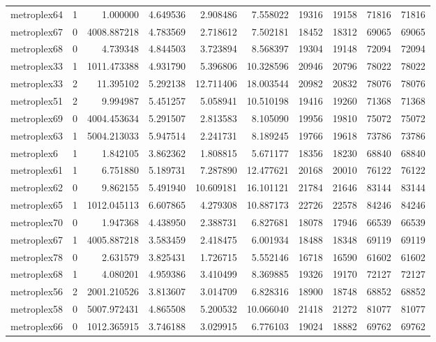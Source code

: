 \begin{longtable}{|l|r|r|r|r|r|r|r|r|r|}
metroplex64 & 1 & 1.000000 & 4.649536 & 2.908486 & 7.558022 & 19316 & 19158 & 71816 & 71816 \\
metroplex67 & 0 & 4008.887218 & 4.783569 & 2.718612 & 7.502181 & 18452 & 18312 & 69065 & 69065 \\
metroplex68 & 0 & 4.739348 & 4.844503 & 3.723894 & 8.568397 & 19304 & 19148 & 72094 & 72094 \\
metroplex33 & 1 & 1011.473388 & 4.931790 & 5.396806 & 10.328596 & 20946 & 20796 & 78022 & 78022 \\
metroplex33 & 2 & 11.395102 & 5.292138 & 12.711406 & 18.003544 & 20982 & 20832 & 78076 & 78076 \\
metroplex51 & 2 & 9.994987 & 5.451257 & 5.058941 & 10.510198 & 19416 & 19260 & 71368 & 71368 \\
metroplex69 & 0 & 4004.453634 & 5.291507 & 2.813583 & 8.105090 & 19956 & 19810 & 75072 & 75072 \\
metroplex63 & 1 & 5004.213033 & 5.947514 & 2.241731 & 8.189245 & 19766 & 19618 & 73786 & 73786 \\
metroplex6 & 1 & 1.842105 & 3.862362 & 1.808815 & 5.671177 & 18356 & 18230 & 68840 & 68840 \\
metroplex61 & 1 & 6.751880 & 5.189731 & 7.287890 & 12.477621 & 20168 & 20010 & 76122 & 76122 \\
metroplex62 & 0 & 9.862155 & 5.491940 & 10.609181 & 16.101121 & 21784 & 21646 & 83144 & 83144 \\
metroplex65 & 1 & 1012.045113 & 6.607865 & 4.279308 & 10.887173 & 22726 & 22578 & 84246 & 84246 \\
metroplex70 & 0 & 1.947368 & 4.438950 & 2.388731 & 6.827681 & 18078 & 17946 & 66539 & 66539 \\
metroplex67 & 1 & 4005.887218 & 3.583459 & 2.418475 & 6.001934 & 18488 & 18348 & 69119 & 69119 \\
metroplex78 & 0 & 2.631579 & 3.825431 & 1.726715 & 5.552146 & 16718 & 16590 & 61602 & 61602 \\
metroplex68 & 1 & 4.080201 & 4.959386 & 3.410499 & 8.369885 & 19326 & 19170 & 72127 & 72127 \\
metroplex56 & 2 & 2001.210526 & 3.813607 & 3.014709 & 6.828316 & 18900 & 18748 & 68852 & 68852 \\
metroplex58 & 0 & 5007.972431 & 4.865508 & 5.200532 & 10.066040 & 21418 & 21272 & 81077 & 81077 \\
metroplex66 & 0 & 1012.365915 & 3.746188 & 3.029915 & 6.776103 & 19024 & 18882 & 69762 & 69762 \\

\end{longtable}
